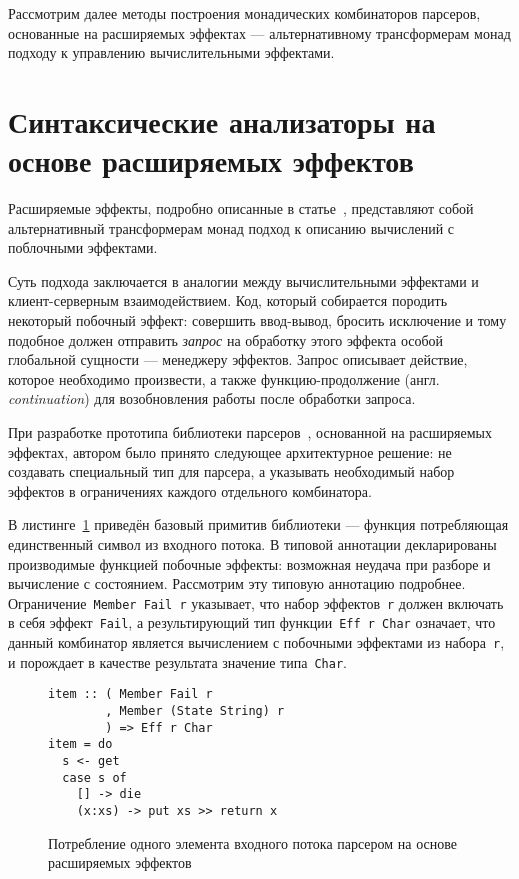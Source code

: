   Рассмотрим далее методы построения монадических комбинаторов парсеров, основанные
  на расширяемых эффектах --- альтернативному трансформерам монад подходу к управлению
  вычислительными эффектами.  

\section{Синтаксические анализаторы на основе расширяемых эффектов}

  Расширяемые эффекты, подробно описанные в статье~\cite{extEffects}, представляют
  собой альтернативный трансформерам монад подход к описанию вычислений с поблочными
  эффектами.

  Суть подхода заключается в аналогии между вычислительными эффектами и
  клиент-серверным взаимодействием. Код, который собирается породить некоторый
  побочный эффект: совершить ввод-вывод, бросить исключение и тому подобное должен
  отправить \emph{запрос} на обработку этого эффекта особой глобальной сущности
  --- менеджеру эффектов. Запрос описывает действие, которое необходимо
  произвести, а также функцию-продолжение (англ. \emph{continuation}) для
  возобновления работы после обработки запроса.

  При разработке прототипа библиотеки парсеров~\cite{extEffParsers}, основанной на расширяемых 
  эффектах, автором было принято следующее архитектурное решение: 
  не создавать специальный тип для парсера, а указывать необходимый набор эффектов 
  в ограничениях каждого отдельного комбинатора.

  В листинге~\ref{listing:extEffItem} приведён базовый примитив библиотеки ---
  функция потребляющая единственный символ из входного потока. 
  В типовой аннотации декларированы
  производимые функцией побочные эффекты: возможная неудача при разборе и 
  вычисление с состоянием. Рассмотрим эту типовую аннотацию подробнее. 
  Ограничение~\lstinline{Member Fail r} указывает, что набор 
  эффектов~\lstinline{r} должен включать в себя эффект~\lstinline{Fail}, а 
  результирующий тип функции~\lstinline{Eff r Char} означает, что данный 
  комбинатор является вычислением с побочными эффектами из набора~\lstinline{r},
  и порождает в качестве результата значение типа~\lstinline{Char}. 

  \begin{figure}[h]
  \begin{lstlisting}
item :: ( Member Fail r
        , Member (State String) r
        ) => Eff r Char
item = do
  s <- get
  case s of 
    [] -> die
    (x:xs) -> put xs >> return x 
  \end{lstlisting}
  \caption{Потребление одного элемента входного потока парсером на основе 
  расширяемых эффектов}
  \label{listing:extEffItem}
  \end{figure} 

